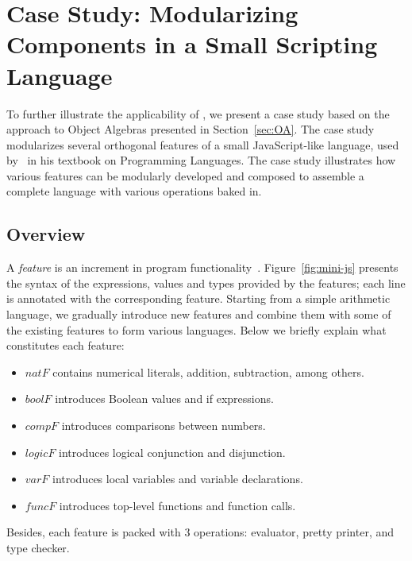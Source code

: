 \section{Case Study: Modularizing Components in a Small Scripting Language}

To further illustrate the applicability of \name, we present a case study based
on the approach to Object Algebras presented in Section~\ref{sec:OA}. The case
study modularizes several orthogonal features of a small
JavaScript-like language, used by~\citet{poplcook} in his textbook
on Programming Languages. The case study illustrates how various features can be
modularly developed and composed to assemble a complete language with
various operations baked in.



\subsection{Overview}

A \textit{feature} is an increment in program functionality~\citep{zave1999faq}.
Figure~\ref{fig:mini-js} presents the syntax of the expressions, values and
types provided by the features; each line is annotated with the corresponding
feature. Starting from a simple arithmetic language, we gradually introduce new
features and combine them with some of the existing features to form various
languages. Below we briefly explain what constitutes each feature:
\begin{itemize}
\item $\mathit{natF}$ contains numerical literals, addition, subtraction, among
  others.
\item $\mathit{boolF}$ introduces Boolean values and if expressions.
\item $\mathit{compF}$ introduces comparisons between numbers.
\item $\mathit{logicF}$ introduces logical conjunction and disjunction.
\item $\mathit{varF}$ introduces local variables and variable declarations.
\item $\mathit{funcF}$ introduces top-level functions and function calls.
\end{itemize}
\noindent Besides, each feature is packed with 3 operations: evaluator, pretty
printer, and type checker.

